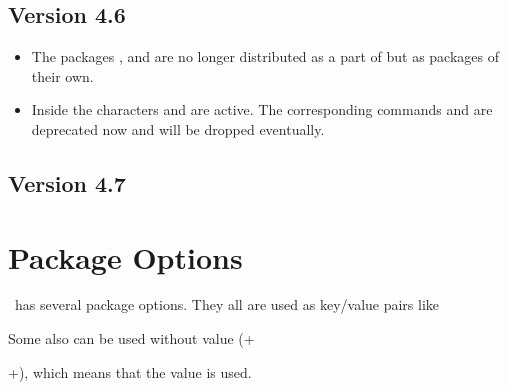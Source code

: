 \documentclass[load-preamble+]{cnltx-doc}
\begin{document}
\subsection{Version 4.6}
\begin{itemize}
  \item The packages \chemformula, \chemgreek{} and \ghsystem{} are no longer
    distributed as a part of \chemmacros{} but as packages of their own.
  \item Inside  the characters \code{\textbar} and
    \code{\textasciicircum} are active.  The corresponding commands
    \cs{\textbar} and \cs{\textasciicircum} are deprecated now and will be
    dropped eventually.
\end{itemize}

\subsection{Version 4.7}

\section{Package Options}\label{sec:options}
\chemmacros\ has several package options. They all are used as key/value pairs
like
\begin{sourcecode}
  \usepackage[option1 = <value1>, option2 = <value2>]{chemmacros}
\end{sourcecode}
Some also can be used without value
(\verbcode+\usepackage[option1]{chemmacros}+), which means that the
 value is used.
\end{document}
